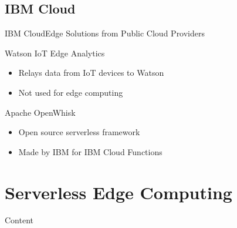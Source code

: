 \documentclass[10pt,xcolor={dvipsnames},notes]{beamer}
\renewcommand{\logofile}{example-grid-100x100pt}
\renewcommand{\logoscale}{0.0}
\begin{document}
\subsection{IBM Cloud}
\renewcommand{\logofile}{img/ibm_cloud_functions}
\renewcommand{\logoscale}{1}
\begin{frame}{IBM Cloud}{Edge Solutions from Public Cloud Providers}

\begin{block}{Watson IoT Edge Analytics}
\begin{itemize}
    \item Relays data from IoT devices to Watson
    \item Not used for edge computing
\end{itemize}
\end{block}

\begin{block}{Apache OpenWhisk}
\begin{itemize}
    \item Open source serverless framework
    \item Made by IBM for IBM Cloud Functions
\end{itemize}
\end{block}
\end{frame}

\section{Serverless Edge Computing}
\renewcommand{\logoscale}{0}
\begin{frame}{Content}{}
\tableofcontents[currentsection]
\end{frame}
\end{document}
